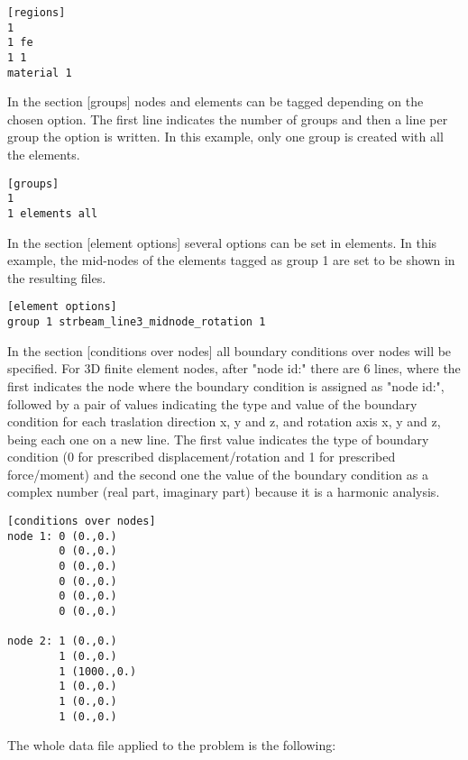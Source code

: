 \documentclass[a4]{article}
\begin{document}
\begin{Verbatim}	
[regions]
1
1 fe
1 1
material 1
\end{Verbatim}

In the section [groups] nodes and elements can be tagged depending on the chosen option. The first line indicates the number of groups and then a line per group the option is written. In this example, only one group is created with all the elements. 

\begin{Verbatim}
[groups]
1
1 elements all
\end{Verbatim}

In the section [element options] several options can be set in elements. In this example, the mid-nodes of the elements tagged as group 1 are set to be shown in the resulting files.  

\begin{Verbatim}
[element options]
group 1 strbeam_line3_midnode_rotation 1
\end{Verbatim}

In the section [conditions over nodes] all boundary conditions over nodes will be specified. For 3D finite element nodes, after "node id:" there are 6 lines, where the first indicates the node where the boundary condition is assigned as "node id:", followed by a pair of values indicating the type and value of the boundary condition for each traslation direction x, y and z, and rotation axis x, y and z, being each one on a new line. The first value indicates the type of boundary condition (0 for prescribed displacement/rotation and 1 for prescribed force/moment) and the second one the value of the boundary condition as a complex number (real part, imaginary part) because it is a harmonic analysis. 

\begin{Verbatim}	
[conditions over nodes]
node 1: 0 (0.,0.)
        0 (0.,0.)
        0 (0.,0.)
        0 (0.,0.)
        0 (0.,0.)
        0 (0.,0.)

node 2: 1 (0.,0.)
        1 (0.,0.)
        1 (1000.,0.)
        1 (0.,0.)
        1 (0.,0.)
        1 (0.,0.)
\end{Verbatim}

The whole data file applied to the problem is the following:
\end{document}
